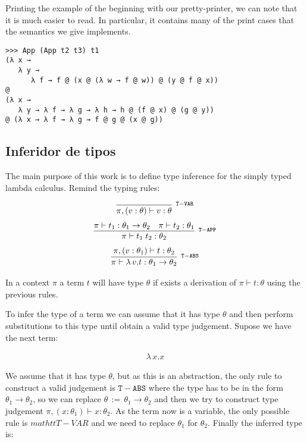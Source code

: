 \documentclass[a4paper,10pt]{article}
\newcommand{\typejud}[3] {
  \ensuremath{#1 \vdash #2 : #3}
}
\begin{document}
Printing the example of the beginning with our pretty-printer, we can note that it is much easier 
to read. In particular, it contains many of the print cases that the semantics we give implements.

\begin{verbatim}
>>> App (App t2 t3) t1
(λ x →
   λ y →
      λ f → f @ (x @ (λ w → f @ w)) @ (y @ f @ x))
@
(λ x →
   λ y → λ f → λ g → λ h → h @ (f @ x) @ (g @ y))
@ (λ x → λ f → λ g → f @ g @ (x @ g))
\end{verbatim}

\subsection{Inferidor de tipos}


 The main purpose of this work is to define type inference for the simply typed lambda calculus. Remind the typing rules:
 
 \begin{align*}
 \infer[^{\mathtt{T-VAR}}]
       {\typejud{\pi,(v:\theta)}{v}{\theta}}
       {}
 \end{align*}
  \begin{align*}
  \infer[^{\mathtt{T-APP}}]
       {\typejud{\pi}{t_1\;t_2}{\theta_2}}
       {\typejud{\pi}{t_1}{\theta_1\rightarrow\theta_2} &
        \typejud{\pi}{t_2}{\theta_1}
       }
  \end{align*}
  \begin{align*}
  \infer[^{\mathtt{T-ABS}}]
       {\typejud{\pi}{\lambda\,v.t}{\theta_1 \rightarrow \theta_2}}
       {\typejud{\pi,(v:\theta_1)}{t}{\theta_2}
       }
  \end{align*}
 
 In a context $\pi$ a term $t$ will have type $\theta$ if exists a derivation of
 $\typejud{\pi}{t}{\theta}$ using the previous rules.
 
 To infer the type of a term we can assume that it has type $\theta$ and then perform substitutions
 to this type until obtain a valid type judgement. Supose we have the next term:
 
 \begin{align*}
    \lambda\,x.x
 \end{align*}

 We assume that it has type $\theta$, but as this is an abstraction, the only rule to construct a valid
 judgement is $\mathtt{T-ABS}$ where the type has to be in the form $\theta_1 \rightarrow \theta_2$,
 so we can replace $\theta\,:=\,\theta_1 \rightarrow \theta_2$ and then we try to construct type judgement
 $\typejud{\pi,(x:\theta_1)}{x}{\theta_2}$. As the term now is a variable, the only possible rule
 is $mathtt{T-VAR}$ and we need to replace $\theta_1$ for $\theta_2$. Finally the inferred type is:
 
\end{document}
